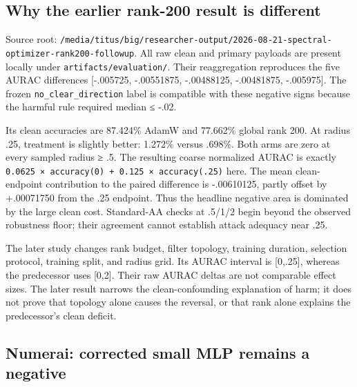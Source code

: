 \documentclass[
  british,
  10pt,
  a4paper,
]{article}
\begin{document}
\subsection{Why the earlier rank-200 result is
different}\label{external-results-audit--why-the-earlier-rank-200-result-is-different}

Source root:
\texttt{/\allowbreak{}media/\allowbreak{}titus/\allowbreak{}big/\allowbreak{}researcher-\allowbreak{}output/\allowbreak{}2026-\allowbreak{}08-\allowbreak{}21-\allowbreak{}spectral-\allowbreak{}optimizer-\allowbreak{}rank200-\allowbreak{}followup}.
All raw clean and primary payloads are present locally under
\texttt{artifacts/\allowbreak{}evaluation/\allowbreak{}}. Their
reaggregation reproduces the five AURAC differences {[}-.005725,
-\allowbreak{}.\allowbreak{}00551875,\allowbreak{}
-\allowbreak{}.\allowbreak{}00488125,\allowbreak{}
-\allowbreak{}.\allowbreak{}00481875,\allowbreak{} -.005975{]}. The
frozen \texttt{no\_\allowbreak{}clear\_\allowbreak{}direction} label is
compatible with these negative signs because the harmful rule required
median ≤ -.02.

Its clean accuracies are 87.424\% AdamW and 77.662\% global rank 200. At
radius .25, treatment is slightly better: 1.272\% versus .698\%. Both
arms are zero at every sampled radius ≥ .5. The resulting coarse
normalized AURAC is exactly
\texttt{0.\allowbreak{}0625 \allowbreak{}× \allowbreak{}accuracy(0) \allowbreak{}+ \allowbreak{}0.\allowbreak{}125 \allowbreak{}× \allowbreak{}accuracy(.\allowbreak{}25)}
here. The mean clean-\allowbreak{}endpoint contribution to the paired
difference is -\allowbreak{}.\allowbreak{}00610125,\allowbreak{} partly
offset by +.00071750 from the .25 endpoint. Thus the headline negative
area is dominated by the large clean cost. Standard-\allowbreak{}AA
checks at .5/1/2 begin beyond the observed robustness floor; their
agreement cannot establish attack adequacy near .25.

The later study changes rank budget, filter topology, training duration,
selection protocol, training split, and radius grid. Its AURAC interval
is {[}0,.25{]}, whereas the predecessor uses {[}0,2{]}. Their raw AURAC
deltas are not comparable effect sizes. The later result narrows the
clean-\allowbreak{}confounding explanation of harm; it does not prove
that topology alone causes the reversal, or that rank alone explains the
predecessor's clean deficit.

\subsection{Numerai: corrected small MLP remains a
negative}\label{external-results-audit--numerai-corrected-small-mlp-remains-a-negative}
\end{document}
